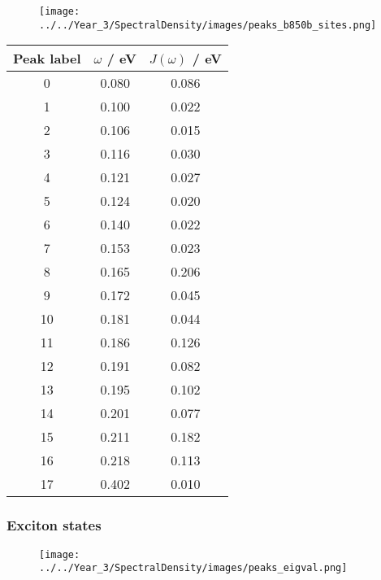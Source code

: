 \begin{figure}
    \centering
    \texttt{[image: ../../Year\_3/SpectralDensity/images/peaks\_b850b\_sites.png]}
\end{figure}

\begin{table}
    \centering
    \begin{tabular}{||c c c||}
    \hline
    Peak label & $\omega$ / eV & $J\left(\omega\right)$ / eV \\
    \hline\hline
    
     0 & 0.080 & 0.086 \\
     1 & 0.100 & 0.022 \\
     2 & 0.106 & 0.015 \\
     3 & 0.116 & 0.030 \\
     4 & 0.121 & 0.027 \\
     5 & 0.124 & 0.020 \\
     6 & 0.140 & 0.022 \\
     7 & 0.153 & 0.023 \\
     8 & 0.165 & 0.206 \\
     9 & 0.172 & 0.045 \\
     10 & 0.181 & 0.044 \\
     11 & 0.186 & 0.126 \\
     12 & 0.191 & 0.082 \\
     13 & 0.195 & 0.102 \\
     14 & 0.201 & 0.077 \\
     15 & 0.211 & 0.182 \\
     16 & 0.218 & 0.113 \\
     17 & 0.402 & 0.010 \\
    \hline 
    \end{tabular}
\end{table}

\afterpartskip
\subsubsection{Exciton states}
\label{subsubsec:specdens_eigval}

\begin{figure}
    \centering
    \texttt{[image: ../../Year\_3/SpectralDensity/images/peaks\_eigval.png]}
\end{figure}


